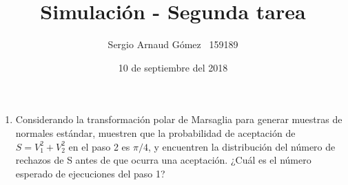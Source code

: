 \documentclass[12 pt]{article}
\title{Simulación - Segunda tarea}
\author{Sergio Arnaud Gómez \quad \quad \ 159189}
\date{10 de septiembre del 2018}
\begin{document}
\maketitle
\begin{enumerate}

	\item Considerando la transformación polar de Marsaglia para generar muestras de normales estándar, muestren que la probabilidad de aceptación de $S = V_1^2 + V_2^2$ en el paso 2 es $\pi/4$, y encuentren la distribución del número de rechazos de S antes de que ocurra una aceptación. ¿Cuál es el número esperado de ejecuciones del paso 1?



\end{enumerate}
\end{document}
